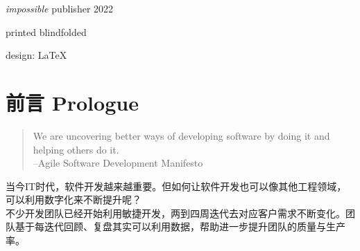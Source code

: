\documentclass{book}        %
\date{}
\begin{document}
\begin{titlepage}\thispagestyle{empty} \vspace*{3em}{\centering\Huge 软件开发过程改进 \par}\clearpage
\newpage \thispagestyle{empty} \mbox{} \cleardoublepage
\thispagestyle{empty} \cleardoublepage

\thispagestyle{empty} \vspace*{\fill} \parbox{.8\textwidth}{\raggedright \scriptsize
\textit{impossible} publisher 2022

printed blindfolded

design: \LaTeX
}
\end{titlepage}
\clearpage \thispagestyle{empty}\cleardoublepage
\newpage %


\tableofcontents %


\chapter*{前言 Prologue} %

\begin{quote}
We are uncovering better ways of developing software by doing it and helping others do it.\\
--Agile Software Development Manifesto
\end{quote}

当今IT时代，软件开发越来越重要。但如何让软件开发也可以像其他工程领域，可以利用数字化来不断提升呢？\\
不少开发团队已经开始利用敏捷开发，两到四周迭代去对应客户需求不断变化。团队基于每迭代回顾、复盘其实可以利用数据，帮助进一步提升团队的质量与生产率。
\end{document}
